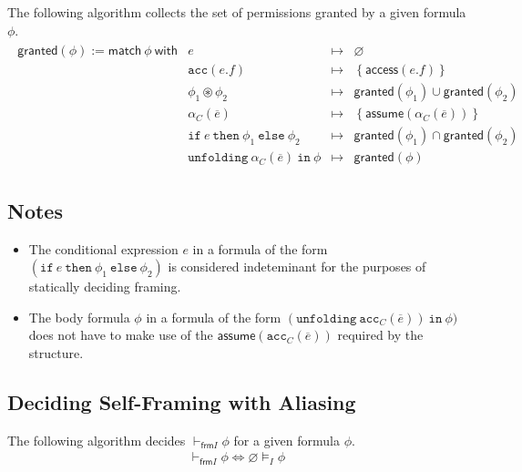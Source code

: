 \documentclass{article}
\newcommand{\tsf}{\textsf}
\newcommand{\ttt}{\texttt}
\newcommand{\access}{\tsf{access}}
\newcommand{\assume}{\tsf{assume}}
\newcommand{\frames}{\vDash_I}
\newcommand{\selfframes}{\vdash_{\tsf{frm}I}}
\newcommand{\mt}{\mapsto}
\newcommand{\set}[1]{\left\{ #1 \right\}}
\newcommand{\cast}{\circledast}
\renewcommand{\vec}{\overline}
\renewcommand{\empty}{\varnothing}
\newcommand{\cif}{\ttt{if}}
\newcommand{\cthen}{\ttt{then}}
\newcommand{\celse}{\ttt{else}}
\newcommand{\cacc}{\ttt{acc}}
\newcommand{\cunfolding}{\ttt{unfolding}}
\newcommand{\cin}{\ttt{in}}
\newcommand{\granted}{\tsf{granted}}
\begin{document}
\noindent
The following algorithm collects the set of permissions granted by a given formula $\phi$.
\begin{align*}
\begin{array}{r|lrl}
\granted(\phi)
:= \tsf{match} \ \phi \ \tsf{with}
%
%
& e                   &\mt& \empty \\
%
%
& \cacc(e.f)          &\mt& \set{ \access(e.f) }
\\
& \phi_1 \cast \phi_2 &\mt& \granted(\phi_1)
                      \cup  \granted(\phi_2)
\\
& \alpha_C(\vec{e})   &\mt& \set{ \assume(\alpha_C(\vec{e})) }
\\
& \cif \ e \ \cthen \ \phi_1 \ \celse \ \phi_2
                      &\mt& \granted(\phi_1) \cap \granted(\phi_2)
\\
& \cunfolding \ \alpha_C(\vec{e}) \ \cin \ \phi
                      &\mt& \granted(\phi)
\end{array}
\end{align*}

\subsection{Notes}

\begin{itemize}
\item The conditional expression $e$ in a formula of the form $(\cif \ e \ \cthen \ \phi_1 \ \celse \ \phi_2)$ is considered indeteminant for the purposes of statically deciding framing.

\item The body formula $\phi$ in a formula of the form $(\cunfolding \ \cacc_C(\vec{e})) \ \cin \ \phi)$ does not have to make use of the $\assume(\cacc_C(\vec{e}))$ required by the structure.
\end{itemize}

\subsection{Deciding Self-Framing with Aliasing}

\noindent
The following algorithm decides $\selfframes \phi$ for a given formula $\phi$.
\begin{align*}
\selfframes \phi \iff \empty \frames \phi
\end{align*}

\end{document}
